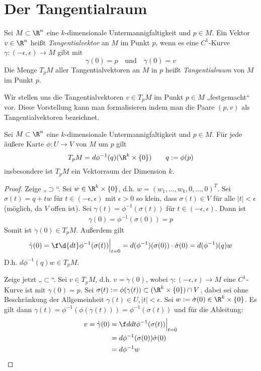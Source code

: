 \documentclass[a4paper,10pt]{scrbook}
\begin{document}
\section{Der Tangentialraum}

\begin{df*}		
	Sei $M\subset \R^n$ eine $k$-dimensionale Untermannigfaltigkeit und $p\in M$.
	Ein Vektor $v\in \R^n$ heißt \emph{Tangentialvektor} an $M$ im Punkt $p$, wenn es eine $C^1$-Kurve $\gamma: (-\epsilon, \epsilon) \to M$ gibt mit
	\[
		\gamma(0) = p \quad \text{und} \quad \dot\gamma(0) = v
	\]
	Die Menge $T_pM$ aller Tangentialvektoren an $M$ in $p$ heißt \emph{Tangentialraum} von $M$ im Punkt $p$.
\end{df*}

\begin{note}
	Wir stellen uns die Tangentialvektoren $v\in T_pM$ im Punkt $p\in M$ „festgemacht“ vor.
	Diese Vorstellung kann man formalisieren indem man die Paare $(p,v)$ als Tangentialvektoren bezeichnet.
\end{note}

\begin{st}
	\label{14.10}
	Sei $M\subset\R^n$ eine $k$-dimensionale Untermannigfaltigkeit und $p\in M$.
	Für jede äußere Karte $\phi: U\to V$ von $M$ um $p$ gilt
	\[
		T_pM = d\phi^{-1}(q)(\R^k\times\{0\}) \qquad q := \phi(p)
	\]
	insbesondere ist $T_pM$ ein Vektorraum der Dimension $k$.
	\begin{proof}
		Zeige „$\supset$“.
		Sei $w\in \R^k\times\{0\}$, d.h. $w=(w_1,\dotsc, w_k, 0,\dotsc, 0)^T$.
		Sei $\sigma(t) = q+tw$ für $t\in (-\epsilon, \epsilon)$ mit $\epsilon > 0$ so klein, dass $\sigma(t) \in V$ für alle $|t| < \epsilon$ (möglich, da $V$ offen ist).
		Sei $\gamma(t) = \phi^{-1}(\sigma(t))$ für $t\in (-\epsilon,\epsilon)$.
		Dann ist
		\begin{align*}
			\gamma(0) = \phi^{-1}(\sigma(0)) = p
		\end{align*}
		Somit ist $\dot\gamma(0) \in T_pM$.
		Außerdem gilt
		\begin{align*}
			\dot\gamma(0) = \f\d{dt}\phi^{-1}(\sigma(t))\Big|_{t=0} = d(\phi^{-1})(\sigma(0))\cdot \dot \sigma(0) = d(\phi^{-1})(q)w
		\end{align*}
		D.h. $d\phi^{-1}(q)w\in T_pM$.

		Zeige jetzt „$\subset$“.
		Sei $v\in T_pM$, d.h. $v=\dot \gamma (0)$, wobei $\gamma : (-\epsilon,\epsilon)\to M$ eine $C^1$-Kurve ist mit $\gamma(0) = p$.
		Sei $\sigma(t) := \phi(\gamma(t)) \subset (\R^k\times\{0\})\cap V$, dabei sei ohne Beschränkung der Allgemeinheit $\gamma(t)\in U, |t|<\epsilon$.
		Sei $w:= \dot \sigma(0) \in \R^k\times\{0\}$.
		Es gilt dann $\gamma(t) = \phi^{-1}(\phi(\gamma(t))) = \phi^{-1}(\sigma(t))$ und für die Ableitung:
		\begin{align*}
			v = \dot\gamma(0) &= \f d{dt}\phi^{-1}(\sigma(t))\Big|_{t=0}\\
																		   &= d\phi^{-1}(\sigma(0))\dot\sigma(0)\\
															   &= d\phi^{-1}w
		\end{align*}
	\end{proof}
\end{st}
\end{document}
